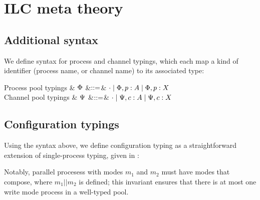 \section{ILC meta theory}
\label{sec:ilcproofs}

\subsection{Additional syntax}

We define syntax for process and channel typings, which each map a kind of
identifier (process name, or channel name) to its associated type:

\begin{grammar}
    Process pool typings
    & $\Phi$
    &$\mathrel{::=}$& $\cdot \mathrel{\mid} \Phi,p:A \mathrel{\mid} \Phi,p:X$
    \\
    Channel pool typings
    & $\Psi$
    &$\mathrel{::=}$& $\cdot \mathrel{\mid} \Psi,c:A \mathrel{\mid} \Psi,c:X$
\end{grammar}

\subsection{Configuration typings}

Using the syntax above, we define configuration typing as a straightforward extension
of single-process typing, given in :


Notably, parallel procesess with modes $m_1$ and $m_2$ must have modes
that compose, where $m_1 || m_2$ is defined; this invariant ensures that there
is at most one write mode process in a well-typed pool.

